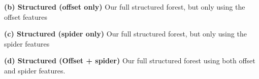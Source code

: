 \documentclass[10pt,twocolumn,letterpaper]{article}
\makeatletter
\newcommand*{\ea}{et al.\@\xspace}
\makeatother
\begin{document}
\noindent \textbf{(b) Structured (offset only)} Our full structured forest, but only using the offset features

\noindent \textbf{(c) Structured (spider only)} Our full structured forest, but only using the spider features

\noindent \textbf{(d) Structured (Offset + spider)}  Our full structured forest using both offset and spider features.




\end{document}
